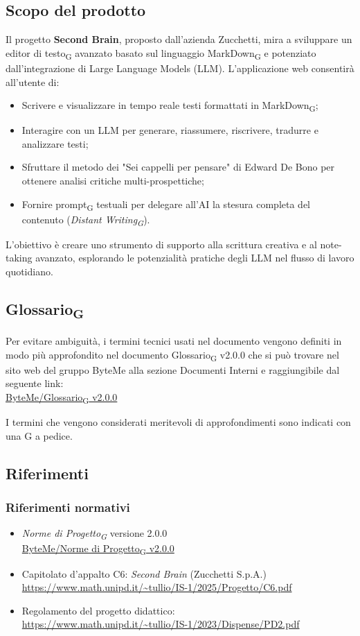 \documentclass[11pt,a4paper]{article}
\newcommand{\gls}[1]{#1\textsubscript{G}}
\begin{document}
\subsection{Scopo del prodotto}
Il progetto \textbf{Second Brain}, proposto dall'azienda Zucchetti, mira a sviluppare un \gls{editor di testo} avanzato basato sul linguaggio \gls{MarkDown} e potenziato dall'integrazione di Large Language Models (LLM).
L'applicazione web consentirà all'utente di:
\begin{itemize}
    \item Scrivere e visualizzare in tempo reale testi formattati in \gls{MarkDown};
    \item Interagire con un LLM per generare, riassumere, riscrivere, tradurre e analizzare testi;
    \item Sfruttare il metodo dei "Sei cappelli per pensare" di Edward De Bono per ottenere analisi critiche multi-prospettiche;
    \item Fornire \gls{prompt} testuali per delegare all'AI la stesura completa del contenuto (\textit{\gls{Distant Writing}}).
\end{itemize}
L'obiettivo è creare uno strumento di supporto alla scrittura creativa e al note-taking avanzato, esplorando le potenzialità pratiche degli LLM nel flusso di lavoro quotidiano.


\subsection{\gls{Glossario}}
Per evitare ambiguità, i termini tecnici usati nel documento vengono definiti in modo più approfondito nel documento \gls{Glossario} v2.0.0 che si può trovare nel sito web del gruppo ByteMe alla sezione Documenti Interni e raggiungibile dal seguente link:\\
\href{https://byteme25.github.io/ByteMe/files.html}{ByteMe/\gls{Glossario} v2.0.0}

I termini che vengono considerati meritevoli di approfondimenti sono indicati con una G a pedice.

\subsection{Riferimenti}
\subsubsection{Riferimenti normativi}
\begin{itemize}
  \item \textit{\gls{Norme di Progetto}} versione 2.0.0\\
  \href{https://byteme25.github.io/ByteMe/files.html}{ByteMe/\gls{Norme di Progetto} v2.0.0}
  \item Capitolato d'appalto C6: \textit{Second Brain} (Zucchetti S.p.A.)\\ \url{https://www.math.unipd.it/~tullio/IS-1/2025/Progetto/C6.pdf}
  \item Regolamento del progetto didattico:\\
        \url{https://www.math.unipd.it/~tullio/IS-1/2023/Dispense/PD2.pdf}
\end{itemize}
\end{document}
